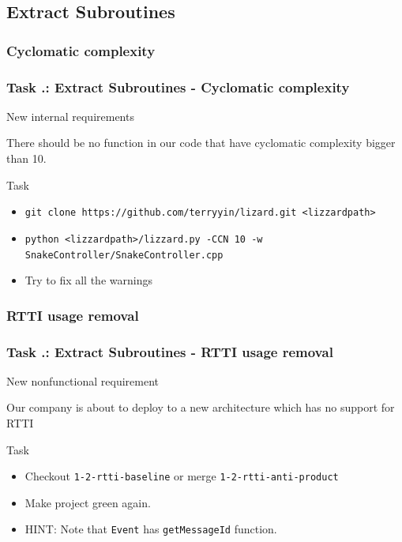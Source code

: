 \documentclass[english]{beamer}
\newenvironment{narrowblock}[1]{%
\begin{center}
\begin{minipage}{10.5cm}
\begin{block}{#1}
}{%
\end{block}
\end{minipage}
\end{center}
}
\begin{document}
\subsection{Extract Subroutines}

\subsubsection{Cyclomatic complexity}

\begin{frame}
\frametitle{Task \thesubsection.\thesubsubsection: Extract Subroutines - Cyclomatic complexity}

\begin{narrowblock}{New internal requirements}
There should be no function in our code that have cyclomatic complexity bigger than 10.
\end{narrowblock}

\pause
\begin{narrowblock}{Task}
\begin{itemize}[<+->]
\item \texttt{git clone https://github.com/terryyin/lizard.git <lizzardpath>}
\item \texttt{python <lizzardpath>/lizzard.py -CCN 10 -w SnakeController/SnakeController.cpp}
\item Try to fix all the warnings
\end{itemize}
\end{narrowblock}
\end{frame}

\subsubsection{RTTI usage removal}

\begin{frame}
\frametitle{Task \thesubsection.\thesubsubsection: Extract Subroutines - RTTI usage removal}

\begin{narrowblock}{New nonfunctional requirement}
Our company is about to deploy to a new architecture which has no support for RTTI
\end{narrowblock}

\pause
\begin{narrowblock}{Task}
\begin{itemize}[<+->]
 \item Checkout \texttt{1-2-rtti-baseline} or merge \texttt{1-2-rtti-anti-product}
 \item Make project green again.
 \item HINT: Note that \texttt{Event} has \texttt{getMessageId} function.
\end{itemize}
\end{narrowblock}
\end{frame}
\end{document}
